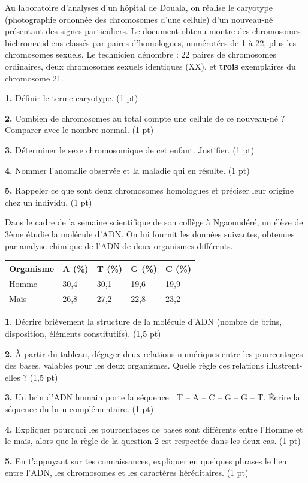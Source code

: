 \documentclass[11pt]{article}
\newcommand{\cle}[1]{{\popxbold\color{popdark}#1}}
\begin{document}
\begin{exercice}
Au laboratoire d'analyses d'un hôpital de Douala, on réalise le caryotype (photographie ordonnée des chromosomes d'une cellule) d'un nouveau-né présentant des signes particuliers. Le document obtenu montre des chromosomes bichromatidiens classés par paires d'homologues, numérotées de 1 à 22, plus les chromosomes sexuels. Le technicien dénombre : 22 paires de chromosomes ordinaires, deux chromosomes sexuels identiques (XX), et \textbf{trois} exemplaires du chromosome 21.

\textbf{1.} Définir le terme \cle{caryotype}. (1 pt)

\textbf{2.} Combien de chromosomes au total compte une cellule de ce nouveau-né ? Comparer avec le nombre normal. (1 pt)

\textbf{3.} Déterminer le sexe chromosomique de cet enfant. Justifier. (1 pt)

\textbf{4.} Nommer l'anomalie observée et la maladie qui en résulte. (1 pt)

\textbf{5.} Rappeler ce que sont deux chromosomes homologues et préciser leur origine chez un individu. (1 pt)
\end{exercice}

\begin{exercice}
Dans le cadre de la semaine scientifique de son collège à Ngaoundéré, un élève de 3ème étudie la molécule d'ADN. On lui fournit les données suivantes, obtenues par analyse chimique de l'ADN de deux organismes différents.

\begin{center}
\begin{tabularx}{\linewidth}{|l|X|X|X|X|}
\hline
\rowcolor{popblueL}
\textbf{Organisme} & \textbf{A (\%)} & \textbf{T (\%)} & \textbf{G (\%)} & \textbf{C (\%)} \\
\hline
Homme & 30,4 & 30,1 & 19,6 & 19,9 \\
\hline
Maïs & 26,8 & 27,2 & 22,8 & 23,2 \\
\hline
\end{tabularx}
\end{center}

\textbf{1.} Décrire brièvement la structure de la molécule d'ADN (nombre de brins, disposition, éléments constitutifs). (1,5 pt)

\textbf{2.} À partir du tableau, dégager deux relations numériques entre les pourcentages des bases, valables pour les deux organismes. Quelle règle ces relations illustrent-elles ? (1,5 pt)

\textbf{3.} Un brin d'ADN humain porte la séquence : T -- A -- C -- G -- G -- T. Écrire la séquence du brin complémentaire. (1 pt)

\textbf{4.} Expliquer pourquoi les pourcentages de bases sont différents entre l'Homme et le maïs, alors que la règle de la question 2 est respectée dans les deux cas. (1 pt)

\textbf{5.} En t'appuyant sur tes connaissances, expliquer en quelques phrases le lien entre l'ADN, les chromosomes et les caractères héréditaires. (1 pt)
\end{exercice}
\end{document}
